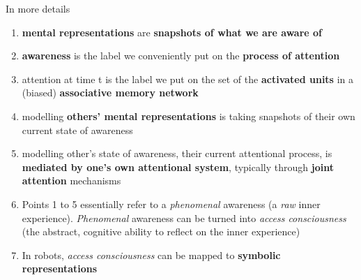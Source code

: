 \documentclass[compress]{beamer}
\begin{document}
{


\begin{frame}{In more details}
\footnotesize
    \begin{enumerate} \item<+-> {\bf mental representations} are {\bf snapshots
                of what we are aware of}

        \item<+-> {\bf awareness} is the label we conveniently put on the {\bf
            process of attention}

        \item<+-> attention at time t is the label we put on the set of the {\bf
            activated units} in a (biased) {\bf associative memory network}

        \item<+-> modelling {\bf others’ mental representations} is taking
            snapshots of their own current state of awareness

        \item<+-> modelling other’s state of awareness, \ie their current
            attentional process, is {\bf mediated by one’s own attentional
            system}, typically through {\bf joint attention} mechanisms

        \item<+-> Points 1 to 5 essentially refer to a \emph{phenomenal}
            awareness (a \emph{raw} inner experience). \emph{Phenomenal}
            awareness can be turned into \emph{access consciousness} (the
            abstract, cognitive ability to reflect on the inner experience)

        \item<+-> In robots, \emph{access consciousness} can be mapped to {\bf
            symbolic representations}

    \end{enumerate}


\end{frame}
}
\end{document}
